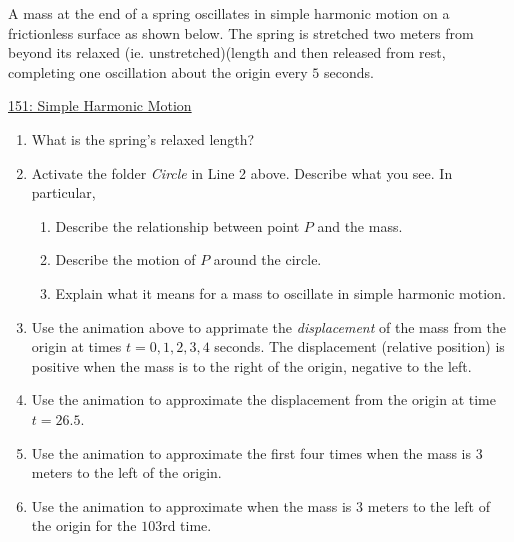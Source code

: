 \documentclass{ximera}
\begin{document}
\begin{example}  \label{Ex:LLL}
A mass at the end of a spring oscillates in simple harmonic motion on a frictionless surface as shown below. The spring is stretched two meters from beyond its relaxed (ie. unstretched)(length and then released from rest, completing one oscillation about the origin every $5$ seconds.

\begin{onlineOnly}
    \begin{center}
\end{center}
\end{onlineOnly}

\href{https://www.desmos.com/calculator/dcba538898}{151: Simple Harmonic Motion}

\begin{enumerate}
\item What is the spring's relaxed length?

\item Activate the folder \emph{Circle} in Line 2 above. Describe what you see. In particular,
\begin{enumerate}
\item Describe the relationship between point $P$ and the mass.

\item Describe the motion of $P$ around the circle.

\item Explain what it means for a mass to oscillate in simple harmonic motion. 
\end{enumerate}

\item Use the animation above to apprimate the \emph{displacement} of the mass from the origin at times $t=0, 1, 2, 3, 4$ seconds. The displacement (relative position) is positive when the mass is to the right of the origin, negative to the left.

\item Use the animation to approximate the displacement from the origin at time $t=26.5$.

\item Use the animation to approximate the first four times when the mass is $3$ meters to the left of the origin.

\item Use the animation to approximate when the mass is $3$ meters to the left of the origin for the $103$rd time.
\end{enumerate}
\end{example}
\end{document}
